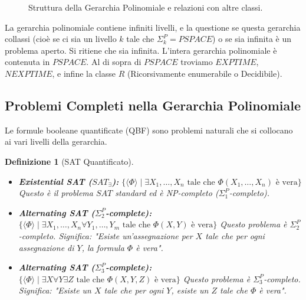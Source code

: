 \documentclass[a4paper, 11pt]{book} %
\newtheorem{definition}[theorem]{Definizione}
\theoremstyle{definition}
\begin{document}
\begin{figure}[h]
    \caption{Struttura della Gerarchia Polinomiale e relazioni con altre classi.}
    \label{fig:polynomial_hierarchy}
\end{figure}

La gerarchia polinomiale contiene infiniti livelli, e la questione se questa gerarchia collassi (cioè se ci sia un livello $k$ tale che $\Sigma_k^P = PSPACE$) o se sia infinita è un problema aperto. Si ritiene che sia infinita. L'intera gerarchia polinomiale è contenuta in $PSPACE$. Al di sopra di $PSPACE$ troviamo $EXPTIME$, $NEXPTIME$, e infine la classe $R$ (Ricorsivamente enumerabile o Decidibile).

\subsection{Problemi Completi nella Gerarchia Polinomiale}
Le formule booleane quantificate (QBF) sono problemi naturali che si collocano ai vari livelli della gerarchia.

\begin{definition}[SAT Quantificato]
\begin{itemize}
    \item \textbf{Existential SAT ($SAT_{\exists}$):}
    $\{ \langle \Phi \rangle \mid \exists X_1, \dots, X_n \text{ tale che } \Phi(X_1, \dots, X_n) \text{ è vera} \}$
    Questo è il problema $SAT$ standard ed è NP-completo ($\Sigma_1^P$-completo).
    \item \textbf{Alternating SAT ($\Sigma_2^P$-complete):}
    $\{ \langle \Phi \rangle \mid \exists X_1, \dots, X_n \forall Y_1, \dots, Y_m \text{ tale che } \Phi(X, Y) \text{ è vera} \}$
    Questo problema è $\Sigma_2^P$-completo. Significa: "Esiste un'assegnazione per $X$ tale che per ogni assegnazione di $Y$, la formula $\Phi$ è vera".
    \item \textbf{Alternating SAT ($\Sigma_3^P$-complete):}
    $\{ \langle \Phi \rangle \mid \exists X \forall Y \exists Z \text{ tale che } \Phi(X, Y, Z) \text{ è vera} \}$
    Questo problema è $\Sigma_3^P$-completo. Significa: "Esiste un $X$ tale che per ogni $Y$, esiste un $Z$ tale che $\Phi$ è vera".
\end{itemize}
\end{definition}
\end{document}
